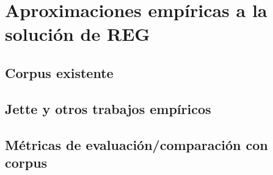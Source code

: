 \section{Aproximaciones emp\'iricas a la soluci\'on de REG}



\subsection{Corpus existente}
\label{sec:corpus-existente}

\label{sec:corpusGRE}
\label{sec:corpusTUNA}

\subsection{Jette y otros trabajos emp\'iricos}

\subsection{M\'etricas de evaluaci\'on/comparaci\'on con corpus}



